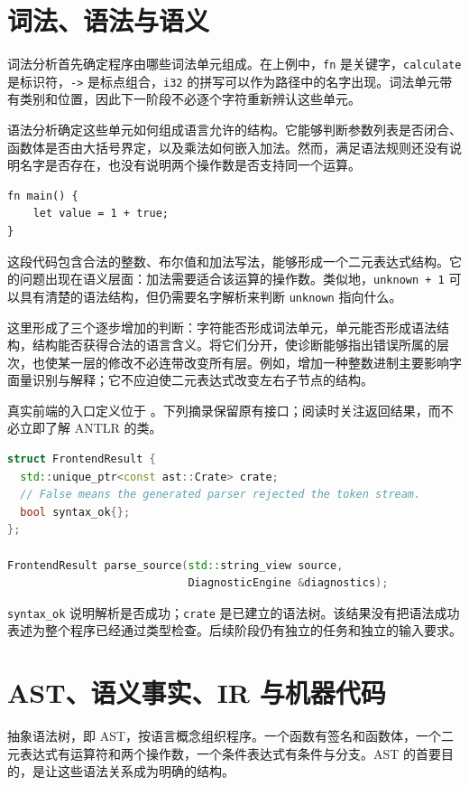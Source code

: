 \section{词法、语法与语义}
词法分析首先确定程序由哪些词法单元组成。在上例中，\texttt{fn} 是关键字，\texttt{calculate} 是标识符，\texttt{->} 是标点组合，\texttt{i32} 的拼写可以作为路径中的名字出现。词法单元带有类别和位置，因此下一阶段不必逐个字符重新辨认这些单元。

语法分析确定这些单元如何组成语言允许的结构。它能够判断参数列表是否闭合、函数体是否由大括号界定，以及乘法如何嵌入加法。然而，满足语法规则还没有说明名字是否存在，也没有说明两个操作数是否支持同一个运算。
\begin{lstlisting}[language=Rustless]
fn main() {
    let value = 1 + true;
}
\end{lstlisting}
这段代码包含合法的整数、布尔值和加法写法，能够形成一个二元表达式结构。它的问题出现在语义层面：加法需要适合该运算的操作数。类似地，\texttt{unknown + 1} 可以具有清楚的语法结构，但仍需要名字解析来判断 \texttt{unknown} 指向什么。

这里形成了三个逐步增加的判断：字符能否形成词法单元，单元能否形成语法结构，结构能否获得合法的语言含义。将它们分开，使诊断能够指出错误所属的层次，也使某一层的修改不必连带改变所有层。例如，增加一种整数进制主要影响字面量识别与解释；它不应迫使二元表达式改变左右子节点的结构。

真实前端的入口定义位于 。下列摘录保留原有接口；阅读时关注返回结果，而不必立即了解 ANTLR 的类。
\begin{lstlisting}[language=C++]
struct FrontendResult {
  std::unique_ptr<const ast::Crate> crate;
  // False means the generated parser rejected the token stream.
  bool syntax_ok{};
};

FrontendResult parse_source(std::string_view source,
                            DiagnosticEngine &diagnostics);
\end{lstlisting}
\texttt{syntax\_ok} 说明解析是否成功；\texttt{crate} 是已建立的语法树。该结果没有把语法成功表述为整个程序已经通过类型检查。后续阶段仍有独立的任务和独立的输入要求。

\section{AST、语义事实、IR 与机器代码}
抽象语法树，即 AST，按语言概念组织程序。一个函数有签名和函数体，一个二元表达式有运算符和两个操作数，一个条件表达式有条件与分支。AST 的首要目的，是让这些语法关系成为明确的结构。

